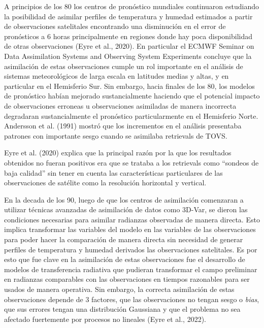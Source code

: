 \documentclass[12pt,oneside]{reedthesis}
\begin{document}
A principios de los 80 los centros de pronóstico mundiales continuaron estudiando la posibilidad de asimilar perfiles de temperatura y humedad estimados a partir de observaciones satelitales encontrando una disminución en el error de pronósticos a 6 horas principalmente en regiones donde hay poca disponibilidad de otras observaciones (Eyre et al., 2020). En particular el ECMWF Seminar on Data Assimilation Systems and Observing System Experiments concluye que la asimilación de estas observaciones cumple un rol importante en el análisis de sistemas meteorológicos de larga escala en latitudes medias y altas, y en particular en el Hemisferio Sur. Sin embargo, hacia finales de los 80, los modelos de pronóstico habían mejorado sustancialmente haciendo que el potencial impacto de observaciones erroneas u observaciones asimiladas de manera incorrecta degradaran sustancialmente el pronóstico particularmente en el Hemisferio Norte. Andersson et al. (1991) mostró que los incrementos en el análisis presentaba patrones con importante sesgo cuando se asimilaba retrievals de TOVS.

Eyre et al. (2020) explica que la principal razón por la que los resultados obtenidos no fueran positivos era que se trataba a los retrievals como ``sondeos de baja calidad'' sin tener en cuenta las características particulares de las observaciones de satélite como la resolución horizontal y vertical.

En la decada de los 90, luego de que los centros de asimilación comenzaran a utilizar técnicas avanzadas de asimilación de datos como 3D-Var, se dieron las condiciones necesarias para asimilar radianzas observadas de manera directa. Esto implica transformar las variables del modelo en las variables de las observaciones para poder hacer la comparación de manera directa sin necesidad de generar perfiles de temperatura y humedad derivados las observaciones satelitales. Es por esto que fue clave en la asimilación de estas observaciones fue el desarrollo de modelos de transferencia radiativa que pudieran transformar el campo preliminar en radianzas comparables con las observaciones en tiempos razonables para ser usados de manera operativa. Sin embargo, la correcta asimilación de estas observaciones depende de 3 factores, que las observaciones no tengan sesgo o \emph{bias}, que sus errores tengan una distribución Gaussiana y que el problema no sea afectado fuertemente por procesos no lineales (Eyre et al., 2022).
\end{document}
